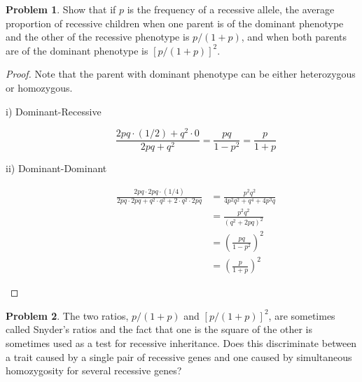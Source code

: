 \documentclass[12pt]{report}
\theoremstyle{definition}
\newtheorem{problem}{Problem}[chapter]
\begin{document}
        \begin{problem}
            Show that if $p$ is the frequency of a recessive allele, the average proportion of recessive children when one parent is of the dominant phenotype and the other of the recessive phenotype is $p/(1+p)$, and when both parents are of the dominant phenotype is $[p/(1+p)]^2$.
            \begin{proof}
                Note that the parent with dominant phenotype can be either heterozygous or homozygous.
                \begin{description}
                    \item[i) Dominant-Recessive]{
                        \begin{equation*}
                            \frac{2pq \cdot (1/2) + q^2 \cdot 0}
                            {2pq+q^2} 
                            = \frac{pq}{1-p^2}
                            = \frac{p}{1+p}
                        \end{equation*}
                    }
                    \item[ii) Dominant-Dominant]{
                        \begin{equation*}
                            \begin{split}
                            \frac{2pq \cdot 2pq \cdot (1/4)}{2pq\cdot 2pq + q^2 \cdot q^2 + 2\cdot q^2 \cdot 2pq} 
                            &= \frac{p^2q^2}{4p^2q^2+q^4+4p^3q} \\
                            &= \frac{p^2q^2}{(q^2+2pq)^2} \\
                            &= \left(\frac{pq}{1-p^2}\right)^2 \\
                            &= \left( \frac{p}{1+p} \right)^2
                        \end{split}
                        \end{equation*}
                    }
                \end{description}
                
            \end{proof}
        \end{problem}

        \begin{problem}
            The two ratios, $p/(1+p)$ and $[p/(1+p)]^2$, are sometimes called Snyder's ratios and the fact that one is the square of the other is sometimes used as a test for recessive inheritance.
            Does this discriminate between a trait caused by a single pair of recessive genes and one caused by simultaneous homozygosity for several recessive genes?
        \end{problem}
\end{document}
